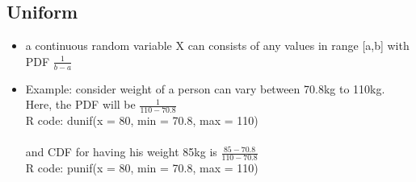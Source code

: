\documentclass{article}
\begin{document}
\subsection{Uniform}
\begin{itemize}
	\item a continuous random variable X can consists of any values in range [a,b] with PDF \mbox{\Large\(\frac{1}{b-a}\)}
	\item Example: consider weight of a person can vary between 70.8kg to 110kg. \\
	
	Here, the PDF will be \mbox{\Large\(\frac{1}{110-70.8}\)} \\
	R code: dunif(x = 80, min = 70.8, max = 110)\\ \\
	and CDF for having his weight 85kg is \mbox{\Large\(\frac{85-70.8}{110-70.8}\)}\\
	R code: punif(x = 80, min = 70.8, max = 110)
\end{itemize}
\end{document}
